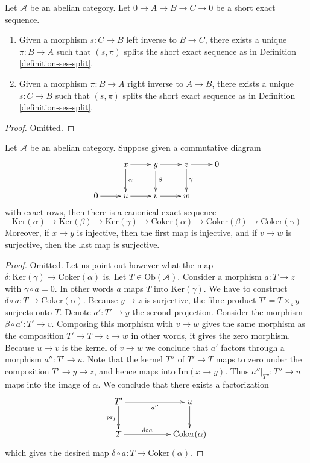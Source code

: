 \begin{lemma}
\label{lemma-ses-split}
Let $\mathcal{A}$ be an abelian category.
Let $0 \to A \to B \to C \to 0$
be a short exact sequence.
\begin{enumerate}
\item Given a morphism $s : C \to B$ left inverse to
$B \to C$, there exists a unique $\pi : B \to A$
such that $(s, \pi)$ splits the short exact sequence
as in Definition \ref{definition-ses-split}.
\item Given a morphism $\pi : B \to A$ right inverse to
$A \to B$, there exists a unique $s : C \to B$
such that $(s, \pi)$ splits the short exact sequence
as in Definition \ref{definition-ses-split}.
\end{enumerate}
\end{lemma}

\begin{proof}
Omitted.
\end{proof}


\begin{lemma}
\label{lemma-snake}
Let $\mathcal{A}$ be an abelian category.
Suppose given a commutative diagram
$$
\xymatrix{
& x \ar[r] \ar[d]^\alpha &
y \ar[r] \ar[d]^\beta &
z \ar[r] \ar[d]^\gamma &
0 \\
0 \ar[r] & u \ar[r] & v \ar[r] & w
}
$$
with exact rows, then there is a canonical exact sequence
$$
\text{Ker}(\alpha) \to \text{Ker}(\beta) \to \text{Ker}(\gamma)
\to
\text{Coker}(\alpha) \to \text{Coker}(\beta) \to \text{Coker}(\gamma)
$$
Moreover, if $x \to y$ is injective, then the first map is
injective, and if $v \to w$ is surjective, then the last
map is surjective.
\end{lemma}

\begin{proof}
Omitted. Let us point out however what the map
$\delta : \text{Ker}(\gamma) \to \text{Coker}(\alpha)$ is.
Let $T \in \text{Ob}(\mathcal{A})$. Consider
a morphism $a : T \to z$ with $\gamma \circ a = 0$.
In other words $a$ maps $T$ into $\text{Ker}(\gamma)$.
We have to construct $\delta \circ a : T \to \text{Coker}(\alpha)$.
Because $y \to z$ is surjective, the fibre product
$T' = T\times_z y$ surjects onto $T$. Denote
$a' : T' \to y$ the second projection. Consider
the morphism $\beta \circ a' : T' \to v$.
Composing this morphism with $v \to w$ gives the
same morphism as the composition $T' \to T \to z \to w$
in other words, it gives the zero morphism.
Because $u \to v$ is the kernel of $v \to w$ we conclude
that $a'$ factors through a morphism $a'' : T' \to u$.
Note that the kernel $T''$ of $T' \to T$ maps to
zero under the composition $T' \to y \to z$, and
hence maps into $\text{Im}(x \to y)$. Thus
$a''|_{T''} : T'' \to u$ maps into the image
of $\alpha$. We conclude that there exists a
factorization
$$
\xymatrix{
T' \ar[rr]_-{a''} \ar[d]_{\text{pr}_1} & &
u \ar[d] \\
T \ar[rr]^-{\delta \circ a} & &
\text{Coker}(\alpha)
}
$$
which gives the desired map $\delta \circ a : T \to \text{Coker}(\alpha)$.
\end{proof}










